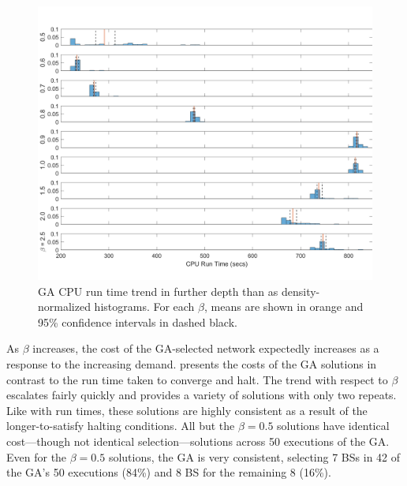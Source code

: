\documentclass[12pt,dvipsnames]{report}
\begin{document}
\begin{figure}[p]
	\centering
	\includegraphics[angle=90,origin=c,height=0.8\textheight]{Figures/CaseI_GARunTime50_9HistogramsTall}
	\caption[Detailed Case I GA CPU run time trends]{GA CPU run time trend in further depth than  as density-normalized histograms.  For each $\beta$, means are shown in orange and 95\% confidence intervals in dashed black.}
	\label{fig:CaseI_GARunTimeHists}
\end{figure}

As $\beta$ increases, the cost of the GA-selected network expectedly increases as a response to the increasing demand.   presents the costs of the GA solutions in contrast to the run time taken to converge and halt.  The trend with respect to $\beta$ escalates fairly quickly and provides a variety of solutions with only two repeats.  Like with run times, these solutions are highly consistent as a result of the longer-to-satisfy halting conditions.  All but the $\beta = 0.5$ solutions have identical cost---though not identical selection---solutions across 50 executions of the GA.  Even for the $\beta = 0.5$ solutions, the GA is very consistent, selecting 7 BSs in 42 of the GA's 50 executions (84\%) and 8 BS for the remaining 8 (16\%).
\end{document}
